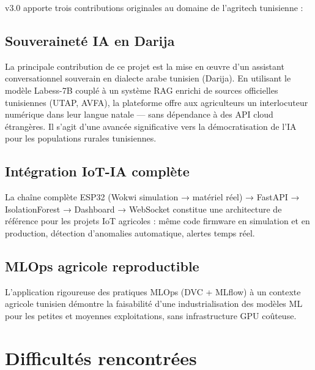 \farmAI{} v3.0 apporte trois contributions originales au domaine de l'agritech tunisienne :

\subsection{Souveraineté IA en Darija}

La principale contribution de ce projet est la mise en œuvre d'un assistant
conversationnel souverain en dialecte arabe tunisien (Darija). En utilisant le modèle
Labess-7B \cite{labess7b} couplé à un système RAG enrichi de sources officielles
tunisiennes (UTAP, AVFA), la plateforme offre aux agriculteurs un interlocuteur
numérique dans leur langue natale — sans dépendance à des API cloud étrangères.
Il s'agit d'une avancée significative vers la démocratisation de l'IA pour les
populations rurales tunisiennes.

\subsection{Intégration IoT-IA complète}

La chaîne complète ESP32 (Wokwi simulation → matériel réel) → FastAPI → IsolationForest
→ Dashboard → WebSocket constitue une architecture de référence pour les projets
IoT agricoles : même code firmware en simulation et en production, détection
d'anomalies automatique, alertes temps réel.

\subsection{MLOps agricole reproductible}

L'application rigoureuse des pratiques MLOps (DVC + MLflow) à un contexte agricole
tunisien démontre la faisabilité d'une industrialisation des modèles ML pour les
petites et moyennes exploitations, sans infrastructure GPU coûteuse.

\section{Difficultés rencontrées}

